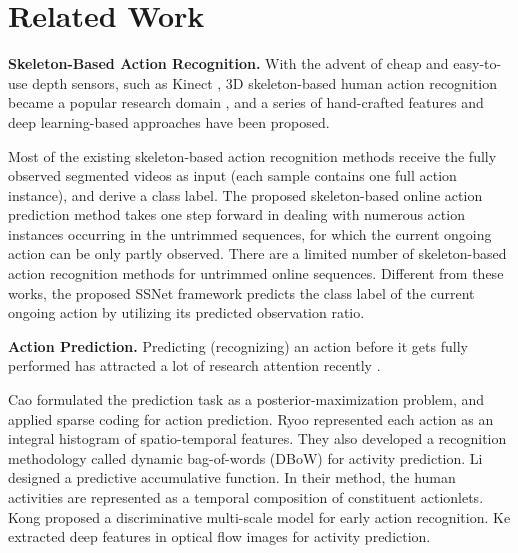 \documentclass[10pt,twocolumn,letterpaper]{article}
\begin{document}
\section{Related Work}
\label{sec:relatedwork}

\textbf{Skeleton-Based Action Recognition.}
With the advent of cheap and easy-to-use depth sensors, such as Kinect \cite{han2013enhanced},
3D skeleton-based human action recognition became a popular research domain \cite{aggarwal2014human,zhang2016rgb},
and a series of hand-crafted features \cite{eigenjointsJournal,actionletPAMI,vemulapalli2014liegroup,shahroudy2016multimodal,skeletalQuads,yun2012two,yu2014discriminative,hu2017jointly,HOJ3D,wang2016graph}
and deep learning-based approaches \cite{du2015hierarchical,ke2018computer,zhu2016co,Shahroudy_2016_CVPR,li2018spatio,kim2017interpretable,liu2016eccv,yan2018spatial,ke2017skeletonnet} have been proposed.

Most of the existing skeleton-based action recognition methods \cite{vemulapalli2014liegroup,Shahroudy_2016_CVPR,huang2017deep,wang2016action,du2015skeleton,ke2017new}
receive the fully observed segmented videos as input (each sample contains one full action instance), and derive a class label.
The proposed skeleton-based online action prediction method takes one step forward in dealing with numerous action instances occurring in the untrimmed sequences,
for which the current ongoing action can be only partly observed.
There are a limited number of skeleton-based action recognition methods \cite{bloom2012g3d} for untrimmed online sequences.
Different from these works, the proposed SSNet framework predicts the class label of the current ongoing action by utilizing its predicted observation ratio.



\textbf{Action Prediction.}
Predicting (recognizing) an action before it gets fully performed has attracted a lot of research attention recently \cite{kong2014discriminative,ryoo2011human,cao2013recognize,xu2015activity,li2014prediction,ke2016human,ke2017leveraging}.

Cao \etal \cite{cao2013recognize} formulated the prediction task as a posterior-maximization problem,
and applied sparse coding for action prediction.
Ryoo \etal \cite{ryoo2011human} represented each action as an integral histogram of spatio-temporal features.
They also developed a recognition methodology called dynamic bag-of-words (DBoW) for activity prediction.
Li \etal \cite{li2012modeling} designed a predictive accumulative function.
In their method, the human activities are represented as a temporal composition of constituent actionlets.
Kong \etal \cite{kong2014discriminative} proposed a discriminative multi-scale model for early action recognition.
Ke \etal \cite{ke2016human} extracted deep features in optical flow images for activity prediction.
\end{document}
